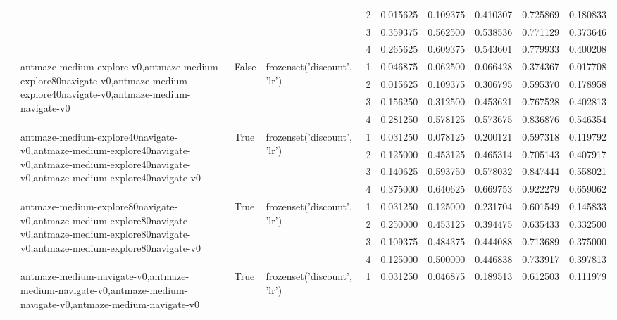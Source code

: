 \begin{tabular}{lllllrrrrr}
 &  &  &  & 2 & 0.015625 & 0.109375 & 0.410307 & 0.725869 & 0.180833 \\
 &  &  &  & 3 & 0.359375 & 0.562500 & 0.538536 & 0.771129 & 0.373646 \\
 &  &  &  & 4 & 0.265625 & 0.609375 & 0.543601 & 0.779933 & 0.400208 \\
\cline{2-10} \cline{3-10} \cline{4-10}
 & \multirow[t]{4}{*}{antmaze-medium-explore-v0,antmaze-medium-explore80navigate-v0,antmaze-medium-explore40navigate-v0,antmaze-medium-navigate-v0} & \multirow[t]{4}{*}{False} & \multirow[t]{4}{*}{frozenset({'discount', 'lr'})} & 1 & 0.046875 & 0.062500 & 0.066428 & 0.374367 & 0.017708 \\
 &  &  &  & 2 & 0.015625 & 0.109375 & 0.306795 & 0.595370 & 0.178958 \\
 &  &  &  & 3 & 0.156250 & 0.312500 & 0.453621 & 0.767528 & 0.402813 \\
 &  &  &  & 4 & 0.281250 & 0.578125 & 0.573675 & 0.836876 & 0.546354 \\
\cline{2-10} \cline{3-10} \cline{4-10}
 & \multirow[t]{4}{*}{antmaze-medium-explore40navigate-v0,antmaze-medium-explore40navigate-v0,antmaze-medium-explore40navigate-v0,antmaze-medium-explore40navigate-v0} & \multirow[t]{4}{*}{True} & \multirow[t]{4}{*}{frozenset({'discount', 'lr'})} & 1 & 0.031250 & 0.078125 & 0.200121 & 0.597318 & 0.119792 \\
 &  &  &  & 2 & 0.125000 & 0.453125 & 0.465314 & 0.705143 & 0.407917 \\
 &  &  &  & 3 & 0.140625 & 0.593750 & 0.578032 & 0.847444 & 0.558021 \\
 &  &  &  & 4 & 0.375000 & 0.640625 & 0.669753 & 0.922279 & 0.659062 \\
\cline{2-10} \cline{3-10} \cline{4-10}
 & \multirow[t]{4}{*}{antmaze-medium-explore80navigate-v0,antmaze-medium-explore80navigate-v0,antmaze-medium-explore80navigate-v0,antmaze-medium-explore80navigate-v0} & \multirow[t]{4}{*}{True} & \multirow[t]{4}{*}{frozenset({'discount', 'lr'})} & 1 & 0.031250 & 0.125000 & 0.231704 & 0.601549 & 0.145833 \\
 &  &  &  & 2 & 0.250000 & 0.453125 & 0.394475 & 0.635433 & 0.332500 \\
 &  &  &  & 3 & 0.109375 & 0.484375 & 0.444088 & 0.713689 & 0.375000 \\
 &  &  &  & 4 & 0.125000 & 0.500000 & 0.446838 & 0.733917 & 0.397813 \\
\cline{2-10} \cline{3-10} \cline{4-10}
 & \multirow[t]{4}{*}{antmaze-medium-navigate-v0,antmaze-medium-navigate-v0,antmaze-medium-navigate-v0,antmaze-medium-navigate-v0} & \multirow[t]{4}{*}{True} & \multirow[t]{4}{*}{frozenset({'discount', 'lr'})} & 1 & 0.031250 & 0.046875 & 0.189513 & 0.612503 & 0.111979 \\

\end{tabular}
